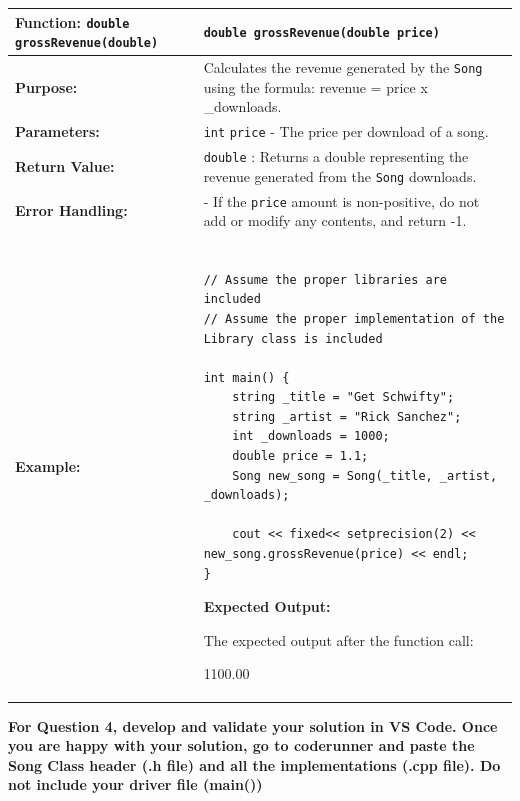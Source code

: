\renewcommand{\arraystretch}{1.5}
\begin{longtable}{|p{1.7in}|p{4.3in}|}
\hline
\textbf{Function:} \texttt{double grossRevenue(double)}& \texttt{double grossRevenue(double price)}\\ \hline

\textbf{Purpose:} & Calculates the revenue generated by the \texttt{Song} using the formula: revenue = price x \_downloads. \\ \hline

\textbf{Parameters:} & 
\texttt{int} \texttt{price} - The price per download of a song.\\ \hline

\textbf{Return Value:} & \texttt{double} : Returns a double representing the revenue generated from the \texttt{Song} downloads.\\ \hline

\textbf{Error Handling:} & 
- If the \texttt{price} amount is non-positive, do not add or modify any contents, and return -1. \newline\\ \hline

\textbf{Example:} & 

\begin{example}

\begin{verbatim}

// Assume the proper libraries are included
// Assume the proper implementation of the Library class is included

int main() {
    string _title = "Get Schwifty";
    string _artist = "Rick Sanchez";
    int _downloads = 1000;
    double price = 1.1;
    Song new_song = Song(_title, _artist, _downloads);

    cout << fixed<< setprecision(2) << new_song.grossRevenue(price) << endl;
}
\end{verbatim}
\end{example}

\textbf{Expected Output:} 

\vspace{5pt}
The expected output after the function call:

1100.00\\ \hline

\end{longtable}

\textbf{For Question 4, develop and validate your solution in VS Code. Once you are happy with your solution, go to coderunner and paste the Song Class header (.h file) and all the implementations (.cpp file). Do not include your driver file (main())}


